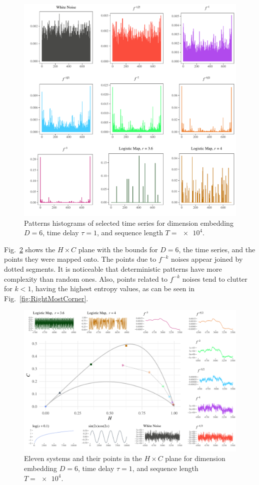 \documentclass[alpha-refs]{wiley-article}
\begin{document}
\begin{figure}[hbt]
	\includegraphics[width=\linewidth]{Figures/h.pdf}
	\caption{Patterns histograms of selected time series  for dimension embedding $D = 6$, time delay $\tau = 1$, and sequence length $T = \num[scientific-notation=true]{e4}$.}
	\label{fig:Histograms}
\end{figure}

Fig.~\ref{fig:AllSystems} shows the $H\times C$ plane with the bounds for $D=6$, the time series, and the points they were mapped onto.
The points due to $f^{-k}$ noises appear joined by dotted segments.
It is noticeable that deterministic patterns have more complexity than random ones.
Also, points related to $f^{-k}$ noises tend to clutter for $k<1$, having the highest entropy values, as can be seen in Fig.~\ref{fig:RightMostCorner}.

\begin{figure}[hbt]
	\centering
	\includegraphics[width=\linewidth]{AllSystems}
	\caption{Eleven systems and their points in the $H\times C$ plane for dimension embedding $D = 6$, time delay $\tau = 1$, and sequence length $T = \num[scientific-notation=true]{e4}$.}
	\label{fig:AllSystems}
\end{figure}
\end{document}
